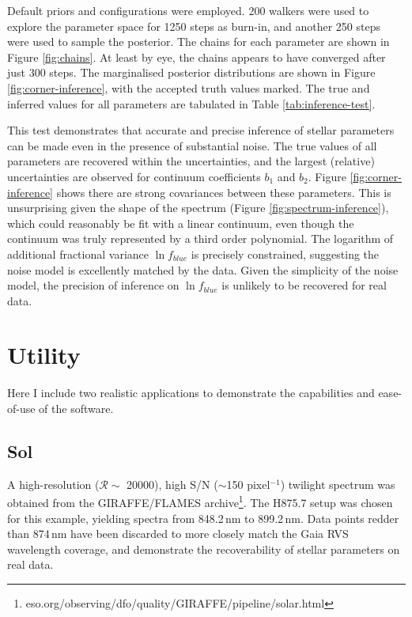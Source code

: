 \documentclass[iop]{emulateapj}
\begin{document}
Default priors and configurations were employed. 200 walkers were used to explore 
the parameter space for 1250 steps as burn-in, and another 250 steps were used to 
sample the posterior. The chains for each parameter are shown in Figure 
\ref{fig:chains}. At least by eye, the chains appears to have converged after 
just 300 steps. The marginalised posterior distributions are shown in Figure 
\ref{fig:corner-inference}, with the accepted truth values marked. The true and 
inferred values for all parameters are tabulated in Table \ref{tab:inference-test}. 

This test demonstrates that accurate and precise inference of stellar parameters 
can be made even in the presence of substantial noise. The true values of all 
parameters are recovered within the uncertainties, and the largest (relative) 
uncertainties are observed for continuum coefficients $b_1$ and $b_2$. Figure 
\ref{fig:corner-inference} shows there are strong covariances between these 
parameters. This is unsurprising given the shape of the spectrum (Figure 
\ref{fig:spectrum-inference}), which could reasonably be fit with a linear 
continuum, even though the continuum was truly represented by a third order 
polynomial. The logarithm of additional fractional variance $\ln{f_{blue}}$ is 
precisely constrained, suggesting the noise model is excellently matched by the 
data. Given the simplicity of the noise model, the precision of inference on 
$\ln{f_{blue}}$ is unlikely to be recovered for real data.

\section{Utility}
\label{sec:examples}
Here I include two realistic applications to demonstrate the capabilities and 
ease-of-use of the software.
 
\subsection{Sol}
\label{sec:sun}
A high-resolution ($\mathcal{R} \sim$ 20000), high S/N ($\sim{}$150 pixel$^{-1}$) 
twilight spectrum was obtained from the GIRAFFE/FLAMES 
archive\footnote{eso.org/observing/dfo/quality/GIRAFFE/pipeline/solar.html}. 
The H875.7 setup was chosen for this example, yielding spectra from 848.2\,nm to 
899.2\,nm. Data points redder than 874\,nm have been discarded to more closely 
match the Gaia RVS wavelength coverage, and demonstrate the recoverability of 
stellar parameters on real data.
\end{document}
